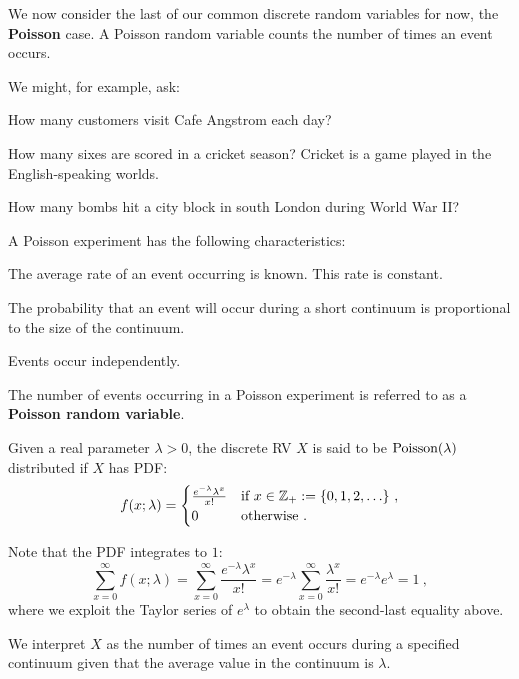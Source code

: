 We now consider the last of our common discrete random variables for now, the {\bf Poisson} case.  
A Poisson random variable counts the number of times an event occurs.

We might, for example, ask:
\bit
\item How many customers visit Cafe Angstrom each day?
\item How many sixes  are scored  in a cricket season? {\scriptsize Cricket is a game played in the English-speaking worlds.}
\item How many bombs hit a city block in south London during World War II?
\eit

A Poisson experiment has the following characteristics:

\bit
\item The average  rate of an event occurring is known. This rate is constant.
\item  The probability that an event  will occur during a short continuum is proportional to the size of the continuum.
\item  Events occur independently.
\eit

The number of events occurring  in a Poisson experiment is referred to as a
{\bf Poisson random variable}.

\begin{model}\label{M:Poisson}
Given a real parameter $\lambda>0$, the discrete RV $X$ is said to be $\mbox{{\rm Poisson}}(\lambda)$ distributed if $X$ has PDF:
\begin{equation}\label{E:Poissonpdf}
f(x;\lambda) =
\begin{cases}
 \frac{ e^{-\lambda} \lambda^x}{x!} & \text{if $x \in \mathbb{Z}_+ := \{0,1,2,\ldots\}$} \ , \\
0 & \text{otherwise} \ .
\end{cases}
\end{equation}

Note that the PDF integrates to $1$:
\[
\sum_{x=0}^{\infty} f(x;\lambda)
= \sum_{x=0}^{\infty}  \frac{ e^{-\lambda} \lambda^x}{x!}
=  e^{-\lambda} \sum_{x=0}^{\infty}  \frac{\lambda^x}{x!}
=  e^{-\lambda} e^{\lambda}
= 1 \ ,
\]
where we exploit the Taylor series of $e^{\lambda}$ to obtain the second-last equality above.

We interpret $X$ as the number of times an event occurs during a
specified continuum given that the average value in the continuum is
$\lambda$. 
\end{model}


